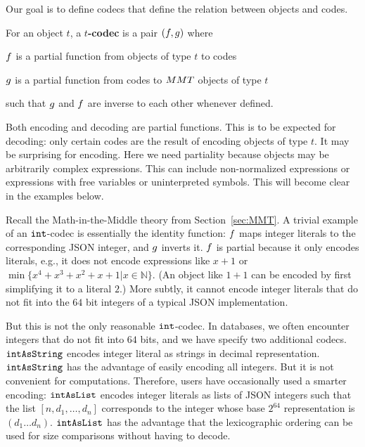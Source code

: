 Our goal is to define codecs that define the relation between \MMT objects and codes.


\begin{mydef}[Codec]
  For an \MMT object $t$, a \textbf{$t$-codec} is a pair $(\enc, \dec)$ where
  \begin{compactitem}
   \item $\enc$ is a partial function from \MMT objects of type $t$ to codes
   \item $\dec$ is a partial function from codes to $\MMT$ objects of type $t$
  \end{compactitem}
  such that $\dec$ and $\enc$ are inverse to each other whenever defined.
\end{mydef}

Both encoding and decoding are partial functions.
This is to be expected for decoding: only certain codes are the result of encoding objects of type $t$.
It may be surprising for encoding.
Here we need partiality because \MMT objects may be arbitrarily complex expressions.
This can include non-normalized expressions or expressions with free variables or uninterpreted symbols.
This will become clear in the examples below.

Recall the Math-in-the-Middle theory from Section~\ref{sec:MMT}.
A trivial example of an $\Int$-codec is essentially the identity function: $\enc$ maps integer literals to the corresponding JSON integer, and $\dec$ inverts it.
$\enc$ is partial because it only encodes literals, e.g., it does not encode expressions like $x+1$ or $\min \{x^4+x^3+x^2+x+1|x\in \mathbb{N}\}$.
(An object like $1+1$ can be encoded by first simplifying it to a literal $2$.)
More subtly, it cannot encode integer literals that do not fit into the $64$ bit integers of a typical JSON implementation.

But this is not the only reasonable $\Int$-codec.  In \LMFDB databases, we often encounter
integers that do not fit into $64$ bits, and we have specify two additional codecs.
$\intAsString$ encodes integer literal as strings in decimal representation.
$\intAsString$ has the advantage of easily encoding all integers.  But it is not
convenient for computations.  Therefore, \LMFDB users have occasionally used a smarter
encoding: $\intAsList$ encodes integer literals as lists of JSON integers such that the
list $[n,d_1,\ldots,d_n]$ corresponds to the integer whose base $2^{64}$ representation is
$(d_1\ldots d_n)$.  $\intAsList$ has the advantage that the lexicographic ordering can be
used for size comparisons without having to decode.

